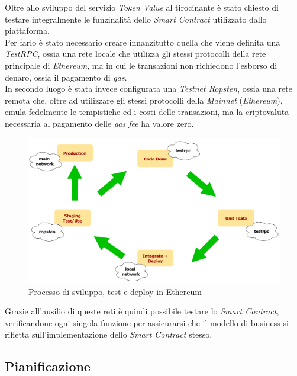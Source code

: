 \documentclass[11pt]{thesistemp}
\begin{document}
Oltre allo sviluppo del servizio \textit{Token Value} al tirocinante è stato chiesto di testare integralmente le funzinalità dello \textit{Smart Contract} utilizzato dallo piattaforma.\\
Per farlo è stato necessario creare innanzitutto quella che viene definita una \textit{TestRPC}, ossia una rete locale che utilizza gli stessi protocolli della rete principale di \textit{Ethereum}, ma in cui le transazioni non richiedono l'esborso di denaro, ossia il pagamento di \textit{gas}.\\
In secondo luogo è stata invece configurata una \textit{Testnet Ropsten}, ossia una rete remota che, oltre ad utilizzare gli stessi protocolli della \textit{Mainnet} (\textit{Ethereum}), emula fedelmente le tempistiche ed i costi delle transazioni, ma la criptovaluta necessaria al pagamento delle \textit{gas fee} ha valore zero.\\
\begin{figure}[h]
    \centering
    \includegraphics[scale=0.28]{testnet-diag.png}
        \caption{Processo di sviluppo, test e deploy in Ethereum}
    \label{fig:testnet-diag}
\end{figure}
\linebreak
Grazie all'ausilio di queste reti è quindi possibile testare lo \textit{Smart Contract}, verificandone ogni singola funzione per assicurarsi che il modello di business si rifletta sull'implementazione dello \textit{Smart Contract} stesso.
\pagebreak

\subsection{Pianificazione}
\end{document}
